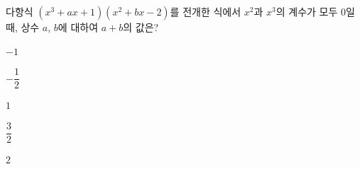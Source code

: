 다항식 $(x^3+ax+1)(x^2+bx-2)$를 전개한 식에서 $x^2$과 $x^3$의 계수가 모두 $0$일 때, 상수 $a$, $b$에 대하여 $a+b$의 값은?
\begin{choices32}{\rule[-3ex]{0pt}{8ex}$-1$}{\rule[-3ex]{0pt}{8ex}$-\dfrac{1}{2}$}{\rule[-3ex]{0pt}{8ex}$1$}{\rule[-3ex]{0pt}{8ex}$\dfrac{3}{2}$}{\rule[-3ex]{0pt}{8ex}$2$}\end{choices32}
